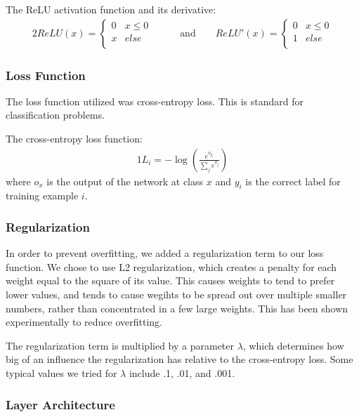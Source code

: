 \documentclass{article} %
\begin{document}
The ReLU activation function and its derivative:
\begin{alignat*}{2}
  ReLU(x) = \begin{cases}
          0 & x\leq 0 \\
          x & else \\
       \end{cases}  &\qquad\text{and}\qquad ReLU'(x) = \begin{cases}
          0 & x\leq 0 \\
          1 & else \\
       \end{cases}
\end{alignat*}

\subsubsection*{Loss Function}

The loss function utilized was cross-entropy loss. This is standard for classification problems.

The cross-entropy loss function:
\begin{alignat*}{1}
  L_i = -\log(\frac{e^{o_{y_i}}}{\sum_j e^{o_j}})
\end{alignat*}
where $o_x$ is the output of the network at class $x$ and $y_i$ is the correct label for training example $i$.

\subsubsection*{Regularization}

In order to prevent overfitting, we added a regularization term to our loss function. We chose to use L2 regularization, which creates a penalty for each weight equal to the square of its value. This causes weights to tend to prefer lower values, and tends to cause wegihts to be spread out over multiple smaller numbers, rather than concentrated in a few large weights. This has been shown experimentally to reduce overfitting.

The regularization term is multiplied by a parameter $\lambda$, which determines how big of an influence the regularization has relative to the cross-entropy loss. Some typical values we tried for $\lambda$ include .1, .01, and .001.

\subsubsection*{Layer Architecture}
\end{document}
